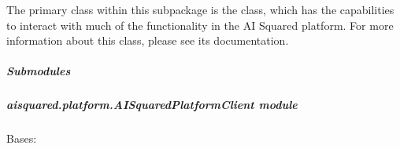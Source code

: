 \documentclass[letterpaper,10pt,english]{sphinxmanual}
\begin{document}
\sphinxAtStartPar
The primary class within this subpackage is the  class, which has the
capabilities to interact with much of the functionality in the AI Squared platform. For more
information about this class, please see its documentation.


\subparagraph{Submodules}
\label{\detokenize{aisquared.platform:submodules}}

\subparagraph{aisquared.platform.AISquaredPlatformClient module}
\label{\detokenize{aisquared.platform:module-aisquared.platform.AISquaredPlatformClient}}\label{\detokenize{aisquared.platform:aisquared-platform-aisquaredplatformclient-module}}

\begin{fulllineitems}
\label{\detokenize{aisquared.platform:aisquared.platform.AISquaredPlatformClient.AISquaredAPIException}}
\pysigstartsignatures
{}
\pysigstopsignatures
\sphinxAtStartPar
Bases: 

\end{fulllineitems}

\end{document}
